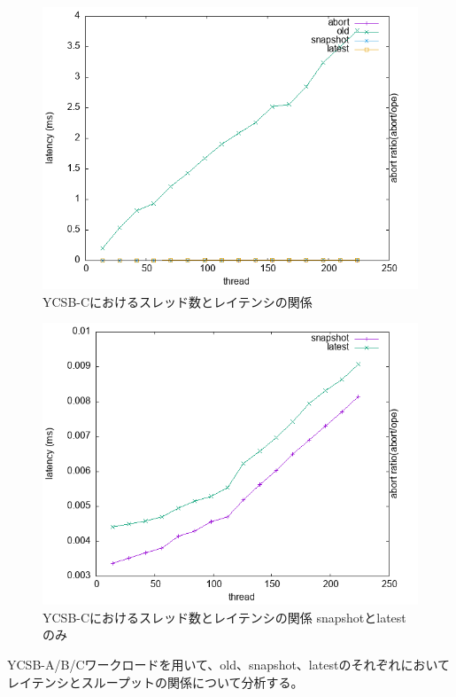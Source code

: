 \documentclass[a4paper]{jreport}	%
\begin{document}
\begin{figure}[h] 
\centering
\includegraphics[width=15cm]{data/stable/ycsb-c/latency}
\caption{YCSB-Cにおけるスレッド数とレイテンシの関係}
\label{fig:latency-c}
\end{figure}

\begin{figure}[h] 
\centering
\includegraphics[width=15cm]{data/stable/ycsb-c/latency-2}
\caption{YCSB-Cにおけるスレッド数とレイテンシの関係 snapshotとlatestのみ}
\label{fig:latency-c2}
\end{figure}


YCSB-A/B/Cワークロードを用いて、old、snapshot、latestのそれぞれにおいてレイテンシとスループットの関係について分析する。
\end{document}
